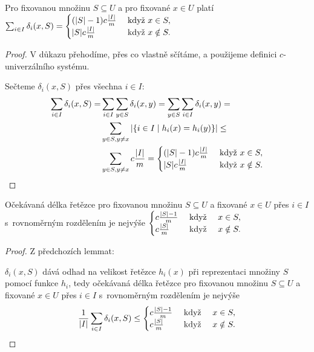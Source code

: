 \documentclass[a4paper,12pt]{article}
\begin{document}
\begin{lemma}
    Pro fixovanou množinu $S\subseteq U$ a pro fixované $
    x\in U$ platí $\sum_{i\in I}\delta_i(x,S)=\begin{cases} (|S|-1)c\frac {|I|}m&\text{\rm\ když }
    x\in S,\\
    |S|c\frac {|I|}m&\text{\rm\ když }x\notin S.\end{cases}$
\end{lemma}
\begin{proof}
    V důkazu  přehodíme, přes co vlastně sčítáme, a použijeme definici $c$-univerzálního systému.
    
Sečteme
$\delta_i(x,S)$ přes všechna $i\in I$:
\begin{align*}\sum_{i\in I}\delta_i(x,S)=&\sum_{i\in I}\sum_{y\in S}\delta_
i(x,y)=\sum_{y\in S}\sum_{i\in I}\delta_i(x,y)=\\
&\sum_{y\in S,y\ne x}|\{i\in I\mid h_i(x)=h_i(y)\}|\le\\
&\sum_{y\in S,y\ne x}c\frac {|I|}m=\begin{cases} (|S|-1)c\frac {|I|}m&\text{\rm\ když }
x\in S,\\
|S|c\frac {|I|}m&\text{\rm\ když }x\notin S.\end{cases} \end{align*}
\end{proof}

\begin{lemma}
    Očekávaná délka řetězce pro fixovanou množinu  
    $S\subseteq U$ a fixované $x\in U$ přes $i\in I$ s~rovnoměrným 
    rozdělením je nejvýše
    $\begin{cases} c\frac {|S|-1}m&\text{\rm\ když }
    \quad x\in S,\\
    c\frac {|S|}m&\text{\rm\ když }\quad x\notin S.\end{cases} $ 
\end{lemma}

\begin{proof}
    Z předchozích lemmat:
    
    $\delta_i(x,S)$ dává odhad na velikost řetězce $
    h_i(x)$ při 
    repre\-zentaci množiny $S$ pomocí funkce $h_i$, tedy 
    očekávaná délka řetězce pro fixovanou množinu  
    $S\subseteq U$ a fixované $x\in U$ přes $i\in I$ s~rovnoměrným 
    rozdělením je nejvýše
    $$\frac 1{|I|}\sum_{i\in I}\delta_i(x,S)\le\begin{cases} c\frac {|S|-1}m&\text{\rm\ když }
    \quad x\in S,\\
    c\frac {|S|}m&\text{\rm\ když }\quad x\notin S.\end{cases} $$
\end{proof}
\end{document}
